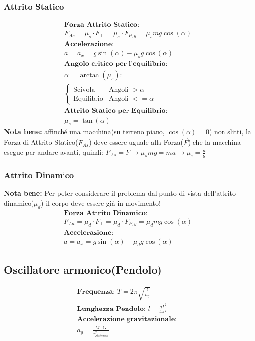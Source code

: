 \subsubsection{Attrito Statico}
\begin{gather*}
    \textbf{Forza Attrito Statico: } \\ F_{As} = \mu_s \cdot F_\perp = \mu_s \cdot F_{P, y} = \mu_s m g \cos (\alpha) \\
    \textbf{Accelerazione: } \\ a = a_x = g \sin (\alpha) - \mu_s g \cos (\alpha) \\
    \textbf{Angolo critico per l'equilibrio: } \\ \alpha = \arctan (\mu_s) : \\
    \begin{cases}
        \text{Scivola} & \text{Angoli } > \alpha \\
        \text{Equilibrio} & \text{Angoli } <= \alpha
    \end{cases}    \\
    \textbf{Attrito Statico per Equilibrio: } \\ \mu_s = \tan (\alpha)
\end{gather*}
\textbf{Nota bene: } affinché una macchina(su terreno piano, $\cos (\alpha) = 0$) non slitti, la Forza di Attrito Statico($F_{As}$) deve essere uguale alla Forza($\vec{F}$) che la macchina esegue per andare avanti, quindi: $F_{As} = F \rightarrow \mu_s m g = m a \rightarrow \mu_s = \frac{a}{g}$
\subsubsection{Attrito Dinamico}
\textbf{Nota bene: } Per poter considerare il problema dal punto di vista dell'attrito dinamico($\mu_d$) il corpo deve essere già in movimento!
\begin{gather*}
    \textbf{Forza Attrito Dinamico:} \\ F_{Ad} = \mu_d \cdot F_\perp = \mu_d \cdot F_{P, y} = \mu_d m g \cos (\alpha) \\
    \textbf{Accelerazione: } \\ a = a_x = g \sin (\alpha) - \mu_d g \cos (\alpha)
\end{gather*}






\subsection{Oscillatore armonico(Pendolo)}
\begin{gather*}
    \textbf{Frequenza: } T = 2 \pi \sqrt{\frac{l}{a_g}} \\
    \textbf{Lunghezza Pendolo: } l = \frac{g T^2}{4 \pi^2} \\
    \textbf{Accelerazione gravitazionale: } \\ a_g = \frac{M \cdot G}{r_{distanza}^2}
\end{gather*}